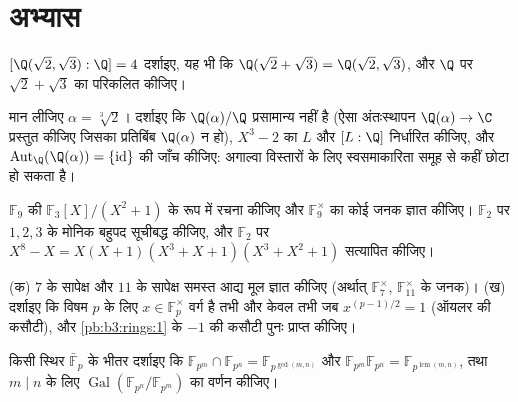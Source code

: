 \section{अभ्यास}

\begin{exercise}[$\star$]\label{exo:b3:galois:1}
$[\Q(\sqrt2, \sqrt3):\Q] = 4$ दर्शाइए, यह भी कि $\Q(\sqrt2 + \sqrt3) =
\Q(\sqrt2, \sqrt3)$, और $\Q$ पर $\sqrt2 + \sqrt3$ का  परिकलित कीजिए।
\end{exercise}

\begin{exercise}[$\star$]\label{exo:b3:galois:2}
मान लीजिए $\alpha = \sqrt[3]2$। दर्शाइए कि $\Q(\alpha)/\Q$ प्रसामान्य नहीं है (ऐसा
अंतःस्थापन $\Q(\alpha) \to \C$ प्रस्तुत कीजिए जिसका प्रतिबिंब $\Q(\alpha)$ न हो),
$X^3 -
2$ का  $L$ और $[L:\Q]$ निर्धारित कीजिए, और
$\operatorname{Aut}_\Q(\Q(\alpha)) =
\{\mathrm{id}\}$ की जाँच कीजिए: अगाल्वा विस्तारों के लिए स्वसमाकारिता समूह
 से कहीं छोटा हो सकता है।
\end{exercise}

\begin{exercise}[$\star$]\label{exo:b3:galois:3}
$\mathbb F_9$ की $\mathbb F_3[X]/(X^2+1)$ के रूप में रचना कीजिए और $\mathbb F_9^\times$ का कोई जनक ज्ञात
कीजिए। $\mathbb F_2$ पर  $1, 2, 3$ के मोनिक  बहुपद सूचीबद्ध कीजिए,
और $\mathbb F_2$ पर $X^8 - X = X(X+1)(X^3+X+1)(X^3+X^2+1)$ सत्यापित कीजिए।
\end{exercise}

\begin{exercise}[$\star\star$]\label{exo:b3:galois:4}
(क) $7$ के सापेक्ष और $11$ के सापेक्ष समस्त आद्य मूल ज्ञात
कीजिए (अर्थात् $\mathbb F_7^\times$, $\mathbb F_{11}^\times$ के जनक)।
(ख) दर्शाइए कि विषम $p$ के लिए $x \in \mathbb F_p^\times$ वर्ग है तभी और केवल तभी
जब $x^{(p-1)/2} = 1$ (ऑयलर की कसौटी), और \cref{pb:b3:rings:1} के $-1$ की कसौटी पुनः
प्राप्त कीजिए।
\end{exercise}

\begin{exercise}[$\star\star$]\label{exo:b3:galois:5}
किसी स्थिर  $\bar{\mathbb F}_p$ के भीतर दर्शाइए कि $\mathbb F_{p^m} \cap \mathbb F_{p^n} = \mathbb
F_{p^{\gcd(m,n)}}$ और
$\mathbb F_{p^m}\mathbb F_{p^n} = \mathbb
F_{p^{\operatorname{lcm}(m,n)}}$, तथा $m
\mid n$ के लिए $\operatorname{Gal}(\mathbb F_{p^n}/\mathbb F_{p^m})$ का वर्णन कीजिए।
\end{exercise}

